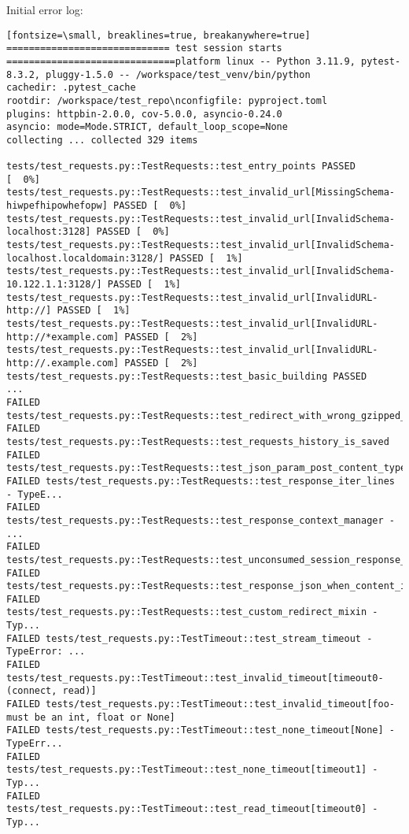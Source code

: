 Initial error log:
\begin{verbatim}[fontsize=\small, breaklines=true, breakanywhere=true]
============================= test session starts ==============================platform linux -- Python 3.11.9, pytest-8.3.2, pluggy-1.5.0 -- /workspace/test_venv/bin/python
cachedir: .pytest_cache
rootdir: /workspace/test_repo\nconfigfile: pyproject.toml
plugins: httpbin-2.0.0, cov-5.0.0, asyncio-0.24.0
asyncio: mode=Mode.STRICT, default_loop_scope=None
collecting ... collected 329 items

tests/test_requests.py::TestRequests::test_entry_points PASSED           [  0%]
tests/test_requests.py::TestRequests::test_invalid_url[MissingSchema-hiwpefhipowhefopw] PASSED [  0%]
tests/test_requests.py::TestRequests::test_invalid_url[InvalidSchema-localhost:3128] PASSED [  0%]
tests/test_requests.py::TestRequests::test_invalid_url[InvalidSchema-localhost.localdomain:3128/] PASSED [  1%]
tests/test_requests.py::TestRequests::test_invalid_url[InvalidSchema-10.122.1.1:3128/] PASSED [  1%]
tests/test_requests.py::TestRequests::test_invalid_url[InvalidURL-http://] PASSED [  1%]
tests/test_requests.py::TestRequests::test_invalid_url[InvalidURL-http://*example.com] PASSED [  2%]
tests/test_requests.py::TestRequests::test_invalid_url[InvalidURL-http://.example.com] PASSED [  2%]
tests/test_requests.py::TestRequests::test_basic_building PASSED
...
FAILED tests/test_requests.py::TestRequests::test_redirect_with_wrong_gzipped_header
FAILED tests/test_requests.py::TestRequests::test_requests_history_is_saved
FAILED tests/test_requests.py::TestRequests::test_json_param_post_content_type_works
FAILED tests/test_requests.py::TestRequests::test_response_iter_lines - TypeE...
FAILED tests/test_requests.py::TestRequests::test_response_context_manager - ...
FAILED tests/test_requests.py::TestRequests::test_unconsumed_session_response_closes_connection
FAILED tests/test_requests.py::TestRequests::test_response_json_when_content_is_None
FAILED tests/test_requests.py::TestRequests::test_custom_redirect_mixin - Typ...
FAILED tests/test_requests.py::TestTimeout::test_stream_timeout - TypeError: ...
FAILED tests/test_requests.py::TestTimeout::test_invalid_timeout[timeout0-(connect, read)]
FAILED tests/test_requests.py::TestTimeout::test_invalid_timeout[foo-must be an int, float or None]
FAILED tests/test_requests.py::TestTimeout::test_none_timeout[None] - TypeErr...
FAILED tests/test_requests.py::TestTimeout::test_none_timeout[timeout1] - Typ...
FAILED tests/test_requests.py::TestTimeout::test_read_timeout[timeout0] - Typ...

\end{verbatim}
